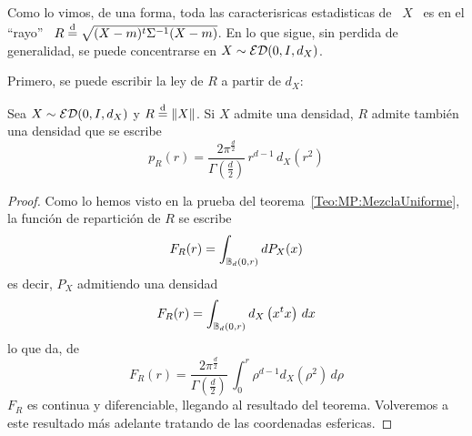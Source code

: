 Como lo vimos, de una forma, toda las caracterisricas estadisticas de \ $X$ \ es
en el  ``rayo'' \ $R \stackrel{\mathrm{d}}{=}  \sqrt{(X-m)^t \Sigma^{-1} (X-m)}$. En  lo que sigue,
sin perdida de generalidad, se puede concentrarse en $X \sim \mathcal{ED}(0,I,d_X)$.

Primero, se puede escribir la ley de $R$ a partir de $d_X$:
%
\begin{teorema}\label{Teo:MP:DensidadRayo}
  Sea $X \sim \mathcal{ED}(0,I,d_X)$ y $R  \stackrel{\mathrm{d}}{=} \|X\|$. Si $X$ admite una densidad, $R$
  admite tambi\'en una densidad que se escribe
  \[
  p_R(r)  =  \frac{2  \pi^{\frac{d}{2}}}{\Gamma\left(  \frac{d}{2}  \right)}  \,
  r^{d-1} \, d_X\left( r^2 \right)
  \]
\end{teorema}
%
\begin{proof}
  Como lo  hemos visto en la prueba  del teorema~\ref{Teo:MP:MezclaUniforme}, la
  funci\'on de repartici\'on de $R$ se escribe
  \[
  F_R(r) = \int_{\mathbb{B}_d(0,r)} dP_X(x)
  \]
  es decir, $P_X$ admitiendo una densidad
  \[
  F_R(r) = \int_{\mathbb{B}_d(0,r)} d_X\left( x^t x \right) \, dx
  \]
  lo que da, de~\cite[Ec.~4.642]{GraRyz15}
  \[
  F_R(r)  =  \frac{2  \pi^{\frac{d}{2}}}{\Gamma\left(  \frac{d}{2}  \right)}  \,
  \int_0^r \rho^{d-1} d_X\left( \rho^2 \right) \, d\rho
  \]
  $F_R$   es    continua   y   diferenciable,   llegando    al   resultado   del
  teorema.  Volveremos   a  este  resultado  m\'as  adelante   tratando  de  las
  coordenadas esfericas.
\end{proof}

